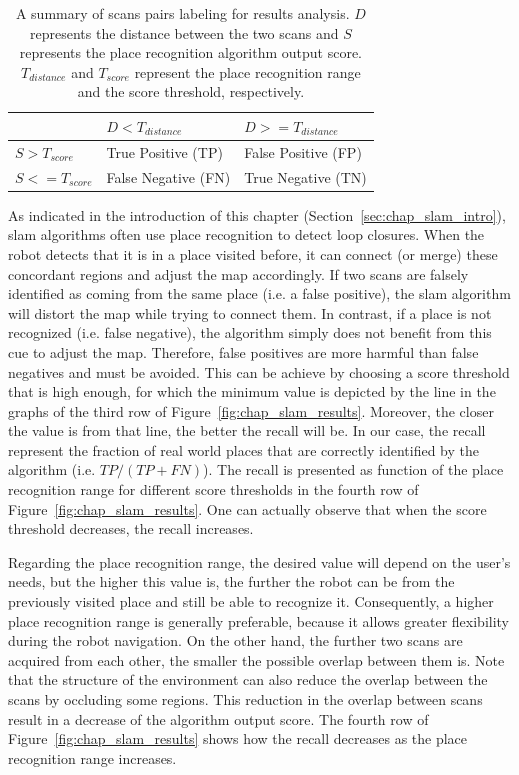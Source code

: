 \begin{table}[H]
    \centering
    \begin{tabular}{@{}l|ll@{}}
        \toprule
                                  & \textbf{$D < T_{distance}$} & \textbf{$D >= T_{distance}$} \\
        \hline
        \textbf{$S > T_{score}$}  & True Positive (TP)          & False Positive (FP) \\
        \textbf{$S <= T_{score}$} & False Negative (FN)         & True Negative (TN) \\
        \bottomrule
    \end{tabular}
    \caption[Summary of scans pairs labeling for results analysis.]{A summary of scans pairs labeling for results analysis. $D$ represents the distance between the two scans and $S$ represents the place recognition algorithm output score. $T_{distance}$ and $T_{score}$ represent the place recognition range and the score threshold, respectively.}
    \label{tab:chap_slam_results_labeling}
\end{table}

As indicated in the introduction of this chapter (Section~\ref{sec:chap_slam_intro}), \gls*{slam} algorithms often use place recognition to detect loop closures. When the robot detects that it is in a place visited before, it can connect (or merge) these concordant regions and adjust the map accordingly. If two scans are falsely identified as coming from the same place (i.e. a false positive), the \gls*{slam} algorithm will distort the map while trying to connect them. In contrast, if a place is not recognized (i.e. false negative), the algorithm simply does not benefit from this cue to adjust the map. Therefore, false positives are more harmful than false negatives and must be avoided. This can be achieve by choosing a score threshold that is high enough, for which the minimum value is depicted by the line in the graphs of the third row of Figure~\ref{fig:chap_slam_results}. Moreover, the closer the value is from that line, the better the recall will be. In our case, the recall represent the fraction of real world places that are correctly identified by the algorithm (i.e. $TP/(TP+FN)$). The recall is presented as function of the place recognition range for different score thresholds in the fourth row of Figure~\ref{fig:chap_slam_results}. One can actually observe that when the score threshold decreases, the recall increases.

Regarding the place recognition range, the desired value will depend on the user's needs, but the higher this value is, the further the robot can be from the previously visited place and still be able to recognize it. Consequently, a higher place recognition range is generally preferable, because it allows greater flexibility during the robot navigation. On the other hand, the further two scans are acquired from each other, the smaller the possible overlap between them is. Note that the structure of the environment can also reduce the overlap between the scans by occluding some regions. This reduction in the overlap between scans result in a decrease of the algorithm output score. The fourth row of Figure~\ref{fig:chap_slam_results} shows how the recall decreases as the place recognition range increases.

